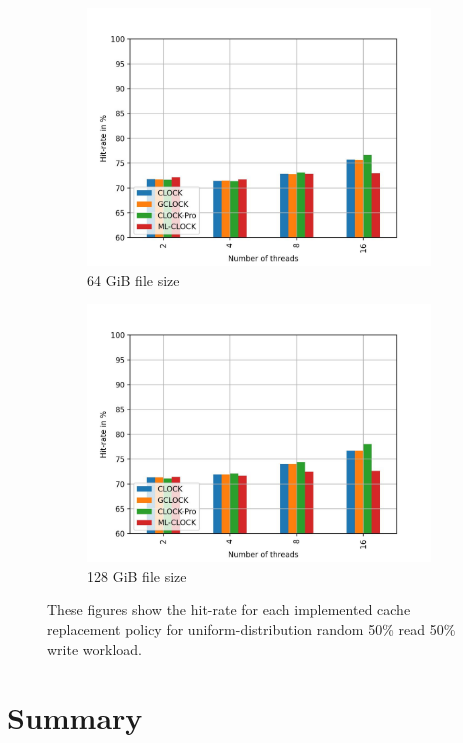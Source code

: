 \documentclass[
	12pt,
	a4paper,
	abstract,
	bibliography=totoc,
	chapterprefix,
	headings=openright,
	numbers=endperiod,
	parskip=half,
	twoside,
]{scrreprt}
\begin{document}
\begin{figure}[H]
\begin{subfigure}{0.4\textwidth}
		\includegraphics[width=\textwidth]{multi_64_gb_rw_50to50_uniform.jpg}		
		\caption{64 GiB file size}
		\label{fig:rw_90to10  zoned}
	\end{subfigure}
	\hfill
	\begin{subfigure}{0.4\textwidth}
		\includegraphics[width=\textwidth]{multi_128_gb_rw_50to50_uniform.jpg}		
		\caption{128 GiB file size}
		\label{fig:rw_90to10  uniform}
	\end{subfigure}
	\caption{These figures show the hit-rate for each implemented cache replacement policy for uniform-distribution random 50\% read 50\% write workload.}
\end{figure}

\section{Summary}
\end{document}
